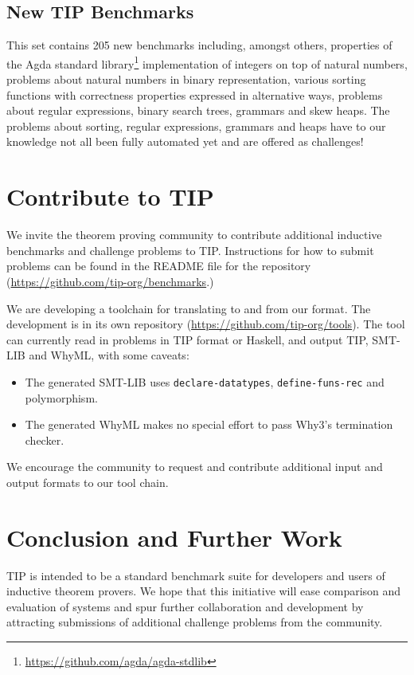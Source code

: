 \documentclass{llncs}
\begin{document}
\subsection{New TIP Benchmarks}
This set contains 205 new benchmarks including, amongst others,
properties of the Agda standard
library\footnote{\url{https://github.com/agda/agda-stdlib}}
implementation of integers on top of natural numbers, problems about natural numbers in binary representation, various sorting functions with correctness properties expressed in alternative ways, problems about regular expressions, binary search trees, grammars and skew heaps. The problems about sorting, regular expressions, grammars and heaps have to our knowledge not all been fully automated yet and are offered as challenges!

\section{Contribute to TIP}
We invite the theorem proving community to contribute additional inductive
benchmarks and challenge problems to TIP. Instructions for how to submit
problems can be found in the README file for the repository
(\url{https://github.com/tip-org/benchmarks}.)

We are developing a toolchain for translating to and from our format. The
development is in its own repository
(\url{https://github.com/tip-org/tools}).
The tool can currently read in problems in TIP format or Haskell, and
output TIP, SMT-LIB and WhyML, with some caveats:
\begin{itemize}
  \item The generated SMT-LIB uses \verb|declare-datatypes|,
    \verb|define-funs-rec| and polymorphism.
  \item The generated WhyML makes no special effort to pass Why3's
    termination checker.
\end{itemize}
We encourage the community to request and contribute additional input
and output formats to our tool chain.

\section{Conclusion and Further Work}

TIP is intended to be a standard benchmark suite for developers 
and users of inductive theorem provers. We hope that this 
initiative will ease comparison and evaluation of systems and 
spur further collaboration and development by attracting 
submissions of additional challenge problems from the community.
\end{document}
